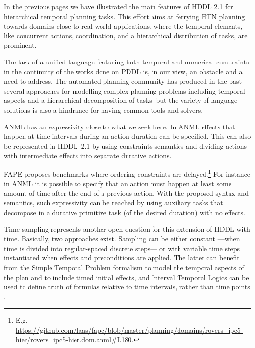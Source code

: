 \documentclass[letterpaper]{article} %
\begin{document}
In the previous pages we have illustrated the main features of HDDL 2.1 for hierarchical temporal planning tasks.
This effort aims at ferrying HTN planning towards domains close to real world applications, where the temporal elements, like concurrent actions, coordination, and a hierarchical distribution of tasks, are prominent.

The lack of a unified language featuring both temporal and numerical constraints in the continuity of the works done on PDDL is, in our view, an obstacle and a need to address. The automated planning community has produced in the past several approaches for modelling complex planning problems including temporal aspects and a hierarchical decomposition of tasks, but the variety of language solutions is also a hindrance for having common tools and solvers.

ANML  \citep{smith08} has an expressivity close to what we seek here.
In ANML effects that happen at time intervals during an action duration can be specified. This  can also be represented in HDDL~2.1 by using constraints semantics and dividing actions with intermediate effects into separate durative actions.

FAPE proposes benchmarks where ordering constraints are delayed.\footnote{E.g. \url{https://github.com/laas/fape/blob/master/planning/domains/rovers_ipc5-hier/rovers_ipc5-hier.dom.anml#L180}.} For instance in ANML it is possible to specify that an action must happen at least some amount of time after the end of a previous action. With the proposed syntax and semantics, such expressivity can be reached by using auxiliary tasks that decompose in a durative primitive task (of the desired duration) with no effects.

Time sampling represents another open question for this extension of HDDL with time.
Basically, two approaches exist. Sampling can be either constant ---when time is divided into regular-spaced discrete steps--- or with variable time steps instantiated when effects and preconditions are applied. The latter can benefit from the Simple Temporal Problem formalism to model the temporal aspects of the plan and to include timed initial effects, and Interval Temporal Logics can be used to define truth of formulas relative to time intervals, rather than time points \citep{BRESOLIN2014269}.

\end{document}
